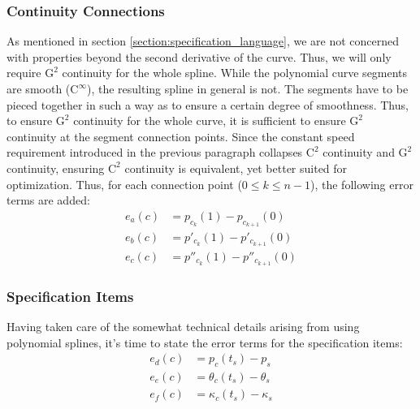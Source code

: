 \documentclass[a4paper]{article}
\newcommand{\apply}[2]{#1\!\left(#2\right)}
\begin{document}
			\subsubsection{Continuity Connections}
			\label{section:continuity_connections}

				As mentioned in section \ref{section:specification_language}, we are not concerned with properties beyond the second derivative of the curve. Thus, we will only require \(\mathrm{G}^2\) continuity for the whole spline. While the polynomial curve segments are smooth (\(\mathrm{C}^\infty\)), the resulting spline in general is not. The segments have to be pieced together in such a way as to ensure a certain degree of smoothness. Thus, to ensure \(\mathrm{G}^2\) continuity for the whole curve, it is sufficient to ensure \(\mathrm{G}^2\) continuity at the segment connection points. Since the constant speed requirement introduced in the previous paragraph collapses \(\mathrm{C}^2\) continuity and \(\mathrm{G}^2\) continuity, ensuring \(\mathrm{C}^2\) continuity is equivalent, yet better suited for optimization. Thus, for each connection point (\(0 \leq k \leq n - 1\)), the following error terms are added:
				\begin{equation*}
					\begin{aligned}
						\apply{e_a}{c} & = \apply{p_{c_k}}{1} - \apply{p_{c_{k+1}}}{0}\\
						\apply{e_b}{c} & = \apply{p'_{c_k}}{1} - \apply{p'_{c_{k+1}}}{0}\\
						\apply{e_c}{c} & = \apply{p''_{c_k}}{1} - \apply{p''_{c_{k+1}}}{0}
					\end{aligned}
				\end{equation*}

			\subsubsection{Specification Items}
			\label{section:specification_items}

				Having taken care of the somewhat technical details arising from using polynomial splines, it's time to state the error terms for the specification items:
				\begin{equation*}
					\begin{aligned}
						\apply{e_d}{c} & = \apply{p_c}{t_s} - p_s\\
						\apply{e_e}{c} & = \apply{\theta_c}{t_s} - \theta_s\\
						\apply{e_f}{c} & = \apply{\kappa_c}{t_s} - \kappa_s
					\end{aligned}
				\end{equation*}
\end{document}
